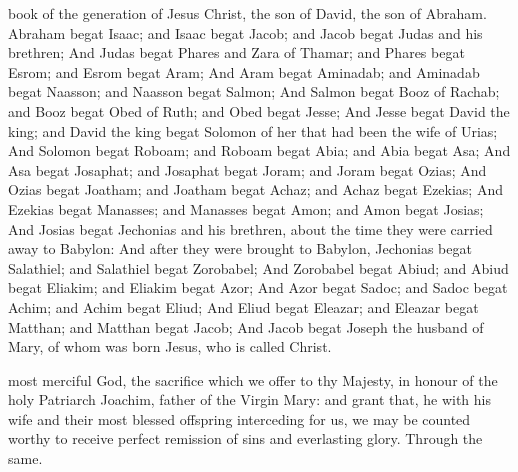 
 book of the generation of Jesus Christ, the son of David, the son of Abraham. Abraham begat Isaac; and Isaac begat Jacob; and Jacob begat Judas and his brethren; And Judas begat Phares and Zara of Thamar; and Phares begat Esrom; and Esrom begat Aram; And Aram begat Aminadab; and Aminadab begat Naasson; and Naasson begat Salmon; And Salmon begat Booz of Rachab; and Booz begat Obed of Ruth; and Obed begat Jesse; And Jesse begat David the king; and David the king begat Solomon of her that had been the wife of Urias; And Solomon begat Roboam; and Roboam begat Abia; and Abia begat Asa; And Asa begat Josaphat; and Josaphat begat Joram; and Joram begat Ozias; And Ozias begat Joatham; and Joatham begat Achaz; and Achaz begat Ezekias; And Ezekias begat Manasses; and Manasses begat Amon; and Amon begat Josias; And Josias begat Jechonias and his brethren, about the time they were carried away to Babylon: And after they were brought to Babylon, Jechonias begat Salathiel; and Salathiel begat Zorobabel; And Zorobabel begat Abiud; and Abiud begat Eliakim; and Eliakim begat Azor; And Azor begat Sadoc; and Sadoc begat Achim; and Achim begat Eliud; And Eliud begat Eleazar; and Eleazar begat Matthan; and Matthan begat Jacob; And Jacob begat Joseph the husband of Mary, of whom was born Jesus, who is called Christ.


\secret
{} most merciful God, the sacrifice which we offer to thy Majesty, in honour of the holy Patriarch Joachim, father of the Virgin Mary: and grant that, he with his wife and their most blessed offspring interceding for us, we may be counted worthy to receive perfect remission of sins and everlasting glory. Through the same.


